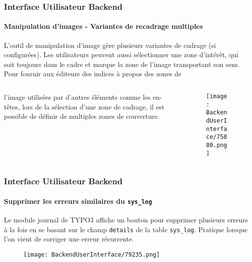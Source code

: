\begin{frame}[fragile]
	\frametitle{Interface Utilisateur Backend}
	\framesubtitle{Manipulation d'images - Variantes de recadrage multiples}

	L'outil de manipulation d'image gère plusieurs variantes de cadrage (si configurées).
	Les utilisateurs peuvent aussi sélectionner une zone d'intérêt, qui soit toujours dans
	le cadre et marque la zone de l'image transportant son sens. Pour fournir aux éditeurs
	des indices à propos des zones de %

	\begin{columns}[T]
		\begin{column}{.35\textwidth}
			l'image utilisées par d'autres éléments comme les en-têtes, lors de la sélection
			d'une zone de cadrage, il est possible de définir de multiples zones de couverture.
		\end{column}

		\begin{column}{.65\textwidth}
			\begin{figure}\vspace*{-0.6cm}
				\texttt{[image: BackendUserInterface/75880.png]}
			\end{figure}
		\end{column}
	\end{columns}

\end{frame}

\begin{frame}[fragile]
	\frametitle{Interface Utilisateur Backend}
	\framesubtitle{Supprimer les erreurs similaires du \texttt{sys\_log}}

	Le module journal de TYPO3 affiche un bouton pour supprimer plusieurs erreurs à la fois
	en se basant sur le champ \texttt{details} de la table \texttt{sys\_log}. Pratique
	lorsque l'on vient de corriger une erreur récurrente.

	\begin{figure}\vspace{-0.2cm}
		\texttt{[image: BackendUserInterface/79235.png]}
	\end{figure}

\end{frame}

